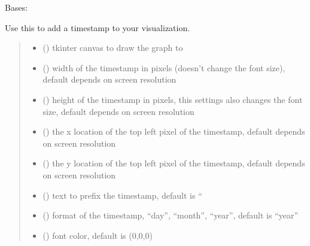 \documentclass[letterpaper,10pt,english]{sphinxmanual}
\begin{document}
\begin{fulllineitems}
\pysigstopsignatures
\sphinxAtStartPar
Bases: 

\sphinxAtStartPar
Use this to add a timestamp to your visualization.
\begin{quote}\begin{description}
\begin{itemize}
\item {} 
\sphinxAtStartPar
{} () \textendash{} tkinter canvas to draw the graph to

\item {} 
\sphinxAtStartPar
{} () \textendash{} width of the timestamp in pixels (doesn’t change the font size), default depends on screen resolution

\item {} 
\sphinxAtStartPar
{} () \textendash{} height of the timestamp in pixels, this settings also changes the font size, default depends on screen resolution

\item {} 
\sphinxAtStartPar
{} () \textendash{} the x location of the top left pixel of the timestamp, default depends on screen resolution

\item {} 
\sphinxAtStartPar
{} () \textendash{} the y location of the top left pixel of the timestamp, default depends on screen resolution

\item {} 
\sphinxAtStartPar
{} () \textendash{} text to prefix the timestamp, default is “

\item {} 
\sphinxAtStartPar
{} () \textendash{} format of the timestamp, “day”, “month”, “year”, default is “year”

\item {} 
\sphinxAtStartPar
{} () \textendash{} font color, default is (0,0,0)


\end{itemize}
\end{description}
\end{quote}
\end{fulllineitems}
\end{document}
